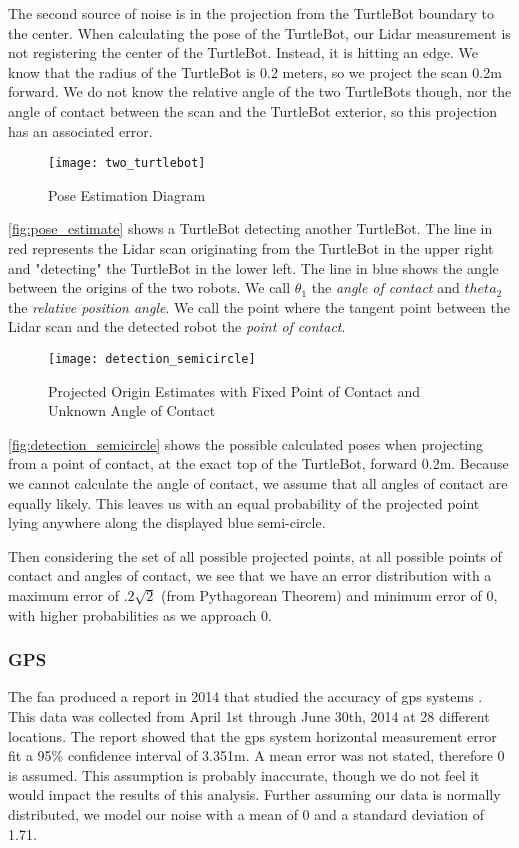 \documentclass[thesis.tex]{subfile}
\begin{document}
The second source of noise is in the projection from the TurtleBot boundary to the center. When calculating the pose of the TurtleBot, our Lidar measurement is not registering the center of the TurtleBot. Instead, it is hitting an edge. We know that the radius of the TurtleBot is 0.2 meters, so we project the scan 0.2m forward. We do not know the relative angle of the two TurtleBots though, nor the angle of contact between the scan and the TurtleBot exterior, so this projection has an associated error.

\begin{figure}
\centering
\texttt{[image: two\_turtlebot]}
\caption{Pose Estimation Diagram}
\label{fig:pose_estimate}
\end{figure}

\autoref{fig:pose_estimate} shows a TurtleBot detecting another TurtleBot. The line in red represents the Lidar scan originating from the TurtleBot in the upper right and "detecting" the TurtleBot in the lower left. The line in blue shows the angle between the origins of the two robots. We call $\theta_1$ the \textit{angle of contact} and $theta_2$ the \textit{relative position angle}. We call the point where the tangent point between the Lidar scan and the detected robot the \textit{point of contact}.

\begin{figure}
\centering
\texttt{[image: detection\_semicircle]}
\caption{Projected Origin Estimates with Fixed Point of Contact and Unknown Angle of Contact}
\label{fig:detection_semicircle}
\end{figure}

\autoref{fig:detection_semicircle} shows the possible calculated poses when projecting from a point of contact, at the exact top of the TurtleBot, forward 0.2m. Because we cannot calculate the angle of contact, we assume that all angles of contact are equally likely. This leaves us with an equal probability of the projected point lying anywhere along the displayed blue semi-circle. 

Then considering the set of all possible projected points, at all possible points of contact and angles of contact, we see that we have an error distribution with a maximum error of $.2\sqrt{2}$ (from Pythagorean Theorem) and minimum error of 0, with higher probabilities as we approach 0.

\subsubsection{GPS}
The \gls{faa} produced a report in 2014 that studied the accuracy of \gls{gps} systems \cite{FAAGPS}. This data was collected from April 1st through June 30th, 2014 at 28 different locations. The report showed that the \gls{gps} system horizontal measurement error fit a 95\% confidence interval of 3.351m. A mean error was not stated, therefore 0 is assumed. This assumption is probably inaccurate, though we do not feel it would impact the results of this analysis. Further assuming our data is normally distributed, we model our noise with a mean of 0 and a standard deviation of 1.71.
\end{document}
